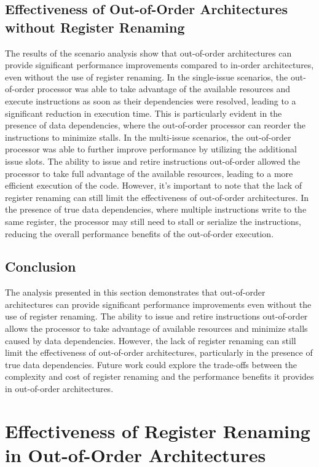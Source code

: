\documentclass{article}
\begin{document}
\subsection{Effectiveness of Out-of-Order Architectures without Register Renaming}
The results of the scenario analysis show that out-of-order architectures can provide significant performance improvements compared to in-order architectures, even without the use of register renaming.
In the single-issue scenarios, the out-of-order processor was able to take advantage of the available resources and execute instructions as soon as their dependencies were resolved, leading to a significant reduction in execution time. This is particularly evident in the presence of data dependencies, where the out-of-order processor can reorder the instructions to minimize stalls.
In the multi-issue scenarios, the out-of-order processor was able to further improve performance by utilizing the additional issue slots. The ability to issue and retire instructions out-of-order allowed the processor to take full advantage of the available resources, leading to a more efficient execution of the code.
However, it's important to note that the lack of register renaming can still limit the effectiveness of out-of-order architectures. In the presence of true data dependencies, where multiple instructions write to the same register, the processor may still need to stall or serialize the instructions, reducing the overall performance benefits of the out-of-order execution.
\subsection{Conclusion}
The analysis presented in this section demonstrates that out-of-order architectures can provide significant performance improvements even without the use of register renaming. The ability to issue and retire instructions out-of-order allows the processor to take advantage of available resources and minimize stalls caused by data dependencies.
However, the lack of register renaming can still limit the effectiveness of out-of-order architectures, particularly in the presence of true data dependencies. Future work could explore the trade-offs between the complexity and cost of register renaming and the performance benefits it provides in out-of-order architectures.
\newpage
\section{Effectiveness of Register Renaming in Out-of-Order Architectures}
\end{document}
